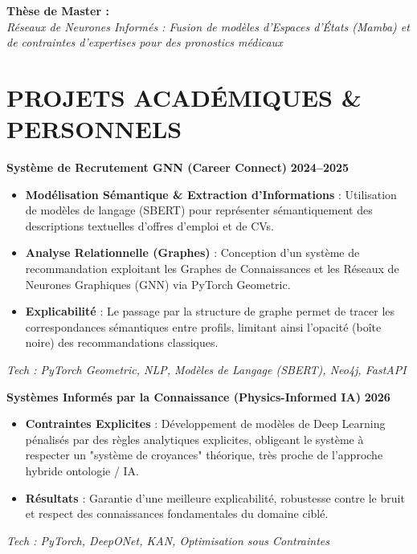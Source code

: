 \documentclass[a4paper,12pt]{article}
\begin{document}
\vspace{4pt}
\textbf{Thèse de Master :} \\
\textit{Réseaux de Neurones Informés : Fusion de modèles d'Espaces d'États (Mamba) et de contraintes d'expertises pour des pronostics médicaux}

\vspace{8pt}
\section{PROJETS ACADÉMIQUES \& PERSONNELS}
\setlength{\parskip}{0pt}

\noindent\textbf{\large Système de Recrutement GNN (Career Connect)} \hfill \textbf{2024--2025}
\vspace{2pt}
{\small
\begin{itemize}
    \item \textbf{Modélisation Sémantique \& Extraction d'Informations} : Utilisation de modèles de langage (SBERT) pour représenter sémantiquement des descriptions textuelles d'offres d'emploi et de CVs.
    \item \textbf{Analyse Relationnelle (Graphes)} : Conception d'un système de recommandation exploitant les Graphes de Connaissances et les Réseaux de Neurones Graphiques (GNN) via PyTorch Geometric.
    \item \textbf{Explicabilité} : Le passage par la structure de graphe permet de tracer les correspondances sémantiques entre profils, limitant ainsi l'opacité (boîte noire) des recommandations classiques.
\end{itemize}
\textit{Tech : PyTorch Geometric, NLP, Modèles de Langage (SBERT), Neo4j, FastAPI}
}
\vspace{8pt}

\noindent\textbf{\large Systèmes Informés par la Connaissance (Physics-Informed IA)} \hfill \textbf{2026}
\vspace{2pt}
{\small
\begin{itemize}
    \item \textbf{Contraintes Explicites} : Développement de modèles de Deep Learning pénalisés par des règles analytiques explicites, obligeant le système à respecter un "système de croyances" théorique, très proche de l'approche hybride ontologie / IA.
    \item \textbf{Résultats} : Garantie d'une meilleure explicabilité, robustesse contre le bruit et respect des connaissances fondamentales du domaine ciblé.
\end{itemize}
\textit{Tech : PyTorch, DeepONet, KAN, Optimisation sous Contraintes}
}
\vspace{8pt}
\end{document}
